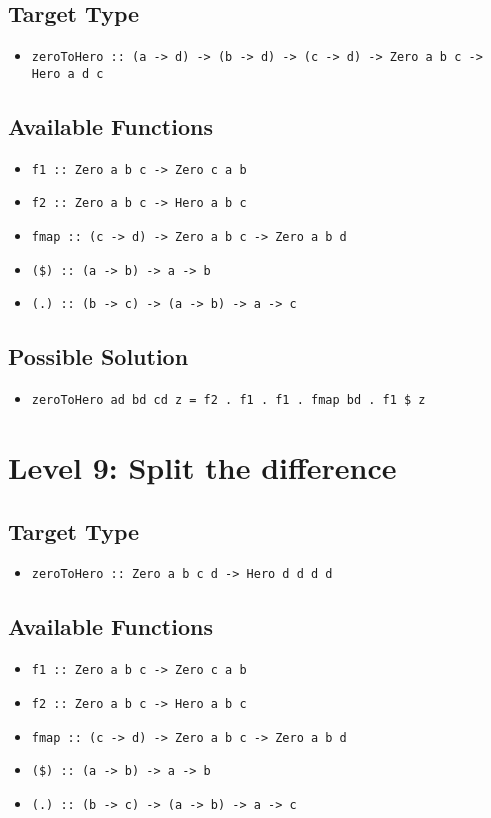 \subsection*{Target Type } 
\begin{itemize}
    \item \texttt{zeroToHero :: (a -> d) -> (b -> d) -> (c -> d) -> Zero a b c ->  Hero a d c}
\end{itemize}

\subsection*{Available Functions} 
\begin{itemize}
    \item \texttt{f1 :: Zero a b c -> Zero c a b}
    \item \texttt{f2 :: Zero a b c -> Hero a b c}
    \item \texttt{fmap :: (c -> d) -> Zero a b c -> Zero a b d}
    \item \texttt{(\$) :: (a -> b) -> a -> b}
    \item \texttt{(.) :: (b -> c) -> (a -> b) -> a -> c}
\end{itemize}

\subsection*{Possible Solution} 
\begin{itemize}
    \item \texttt{zeroToHero ad bd cd z = f2  . f1  . f1  . fmap bd  . f1 \$ z}
\end{itemize}

\section{Level 9: Split the difference}
\subsection*{Target Type } 
\begin{itemize}
    \item \texttt{zeroToHero :: Zero a b c d ->  Hero d d d d}
\end{itemize}

\subsection*{Available Functions} 
\begin{itemize}
    \item \texttt{f1 :: Zero a b c -> Zero c a b}
    \item \texttt{f2 :: Zero a b c -> Hero a b c}
    \item \texttt{fmap :: (c -> d) -> Zero a b c -> Zero a b d}
    \item \texttt{(\$) :: (a -> b) -> a -> b}
    \item \texttt{(.) :: (b -> c) -> (a -> b) -> a -> c}
\end{itemize}

